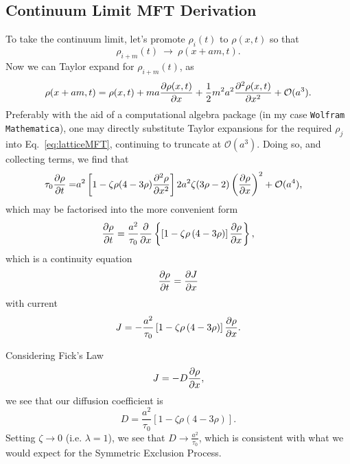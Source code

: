 \subsection{Continuum Limit MFT Derivation}
To take the continuum limit, let's promote $\rho_i (t)$ to $\rho(x, t)$ so that 
\begin{equation}
\rho_{i+m}(t)~\rightarrow~\rho(x+am,t).
\end{equation}
Now we can Taylor expand for $\rho_{i+m} (t)$, as
\begin{equation}
 \rho(x+am,t) = \rho(x, t) + ma \frac{\partial \rho(x, t)}{\partial x} + \frac{1}{2} m^2 a^2 \frac{\partial ^2\rho(x, t)}{\partial x^2} + \mathcal{O}(a^3). 
\end{equation}
Preferably with the aid of a computational algebra package (in my case \texttt{Wolfram Mathematica}), one may directly substitute Taylor expansions for the required $\rho_j$ into Eq.~\ref{eq:latticeMFT}, continuing to truncate
at $\mathcal{O}(a^3)$. Doing so, and collecting terms, we find that
\begin{align}
  \tau_0 \frac{\partial \rho}{\partial t} =& a^2 \left[ 1-\zeta \rho (4-3\rho) \frac{\partial ^2 \rho}{\partial x^2}  \right]
  2 a^2 \zeta (3\rho-2) \left(\frac{\partial \rho}{\partial x}\right)^2 + \mathcal{O}(a^4) ,
\end{align}
which may be factorised into the more convenient form
\begin{equation}
\label{eq:contPDE}
 \frac{\partial \rho}{\partial t} = \frac{a^2}{\tau_0} \frac{\partial }{\partial x} \left\{ \left[1 - \zeta \rho\left(4-3\rho\right) \right] \frac{\partial \rho}{\partial x} \right\},
\end{equation}
which is a continuity equation
\begin{equation}
 \frac{\partial \rho}{\partial t} = \frac{\partial J}{\partial x} 
\end{equation}
with current
\begin{equation}
J = -\frac{a^2}{\tau_0} \left[1 - \zeta \rho\left(4-3\rho\right) \right] \frac{\partial \rho}{\partial x}.
\end{equation}

Considering Fick's Law
\begin{equation}
 J = - D \frac{\partial \rho}{\partial x},
\end{equation}
we see that our diffusion coefficient is
\begin{equation}
 D = \frac{a^2}{\tau_0} \left[1 - \zeta \rho\left(4-3\rho\right) \right].
\end{equation}
Setting $\zeta \rightarrow 0$ (i.e. $\lambda = 1$), we see that $D \rightarrow \frac{a^2}{\tau_0}$, which is consistent with what we would expect for the Symmetric Exclusion Process.

